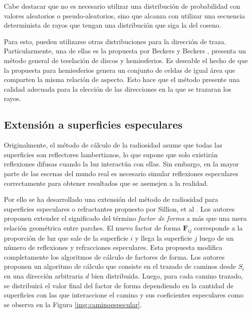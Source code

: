 Cabe destacar que no es necesario utilizar una distribución de probabilidad con valores aleatorios o pseudo-aleatorios, sino que alcanza con utilizar una secuencia determinista de rayos que tengan una distribución que siga la del coseno.

Para esto, pueden utilizarse otras distribuciones para la dirección de traza. Particularmente, una de ellas es la propuesta por Beckers y Beckers \cite{Beckers}, presenta un método general de teselación de discos y hemiesferios. Es deseable el hecho de que la propuesta para hemiesferios genera un conjunto de celdas de igual área que comparten la misma relación de aspecto. Esto hace que el método presente una calidad adecuada para la elección de las direcciones en la que se trazaran los rayos.

\subsection{Extensión a superficies especulares}

Originalmente, el método de cálculo de la radiosidad asume que todas las superficies son reflectores lambertianos, lo que supone que solo existirán reflexiones difusas cuando la luz interactúa con ellas. Sin embargo, en la mayor parte de las escenas del mundo real es necesario simular reflexiones especulares correctamente para obtener resultados que se asemejen a la realidad.

Por ello se ha desarrollado una extensión del método de radiosidad para superficies especulares o refractantes propuesto por Sillion, et al \cite{Sillion}. Los autores proponen extender el significado del término \textit{factor de forma} a más que una mera relación geométrica entre parches. El nuevo factor de forma $\mathbf{F}_{ij}$ corresponde a la proporción de luz que sale de la superficie $i$ y llega la superficie $j$ luego de un número de reflexiones y refracciones especulares. Esta propuesta modifica completamente los algoritmos de cálculo de factores de forma. Los autores proponen un algoritmo de cálculo que consiste en el trazado de caminos desde $S_{i}$ en una dirección arbitraria $d$ bien distribuida.  Luego, para cada camino trazado, se distribuirá el valor final del factor de forma dependiendo en la cantidad de superficies con las que interaccione el camino y sus coeficientes especulares como se observa en la Figura \ref{img:caminoespecular}.

